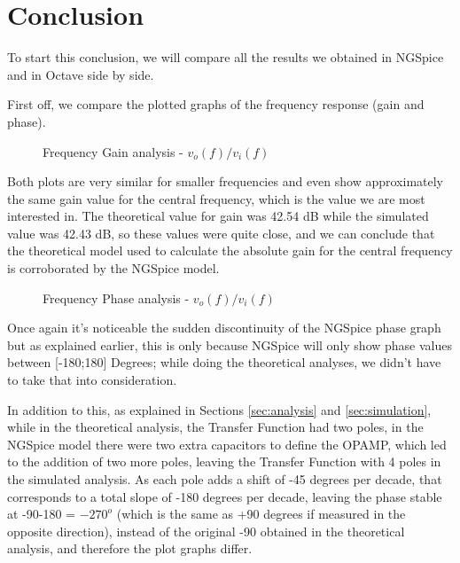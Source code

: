 \section{Conclusion}
\label{sec:conclusion}

To start this conclusion, we will compare all the results we obtained in NGSpice and in Octave side by side. 

First off, we compare the plotted graphs of the frequency response (gain and phase).

\FloatBarrier
\begin{figure}[ht]
	\centering
	\qquad
	\subfloat[NGSpice]{\texttt{[image: vo1f]}}
	\caption{Frequency Gain analysis - $v_o(f)/v_i(f)$}
	\label{fig:conc2}
\end{figure}
\FloatBarrier

Both plots are very similar for smaller frequencies and even show approximately the same gain value for the central frequency, which is the value we are most interested in. The theoretical value for gain was 42.54 dB while the simulated value was 42.43 dB, so these values were quite close, and we can conclude that the theoretical model used to calculate the absolute gain for the central frequency is corroborated by the NGSpice model.

\FloatBarrier
\begin{figure}[ht]
	\centering
	\subfloat[Octave]{\texttt{[image: Tp]}}
	\qquad
	\caption{Frequency Phase analysis - $v_o(f)/v_i(f)$}
	\label{fig:conc3}
\end{figure}
\FloatBarrier

Once again it's noticeable the sudden discontinuity of the NGSpice phase graph but as explained earlier, this is only because NGSpice will only show phase values between [-180;180] Degrees; while doing the theoretical analyses, we didn't have to take that into consideration. 

In addition to this, as explained in Sections \ref{sec:analysis} and \ref{sec:simulation}, while in the theoretical analysis, the Transfer Function had two poles, in the NGSpice model there were two extra capacitors to define the OPAMP, which led to the addition of two more poles, leaving the Transfer Function with 4 poles in the simulated analysis. As each pole adds a shift of -45 degrees per decade, that corresponds to a total slope of -180 degrees per decade, leaving the phase stable at -90-180 = $-270^o$ (which is the same as +90 degrees if measured in the opposite direction), instead of the original -90 obtained in the theoretical analysis, and therefore the plot graphs differ.

